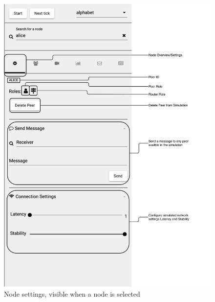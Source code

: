 \begin{figure}
\centering
\includegraphics[width=1\textwidth]{graphics/analysis-tools/visualisation-sidebar-node-settings.pdf}
\caption{Node settings, visible when a node is selected}
\label{fig:anl-node-settings}
\end{figure}

